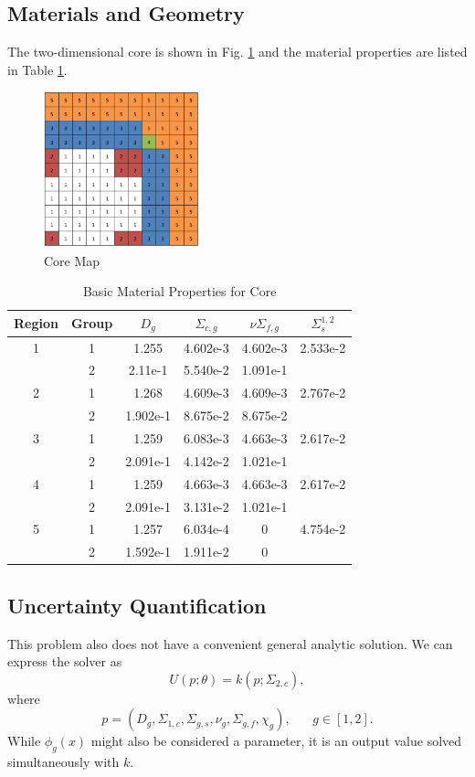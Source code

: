 \subsection{Materials and Geometry}
The two-dimensional core is shown in Fig. \ref{coremap} and the material properties are listed in Table \ref{tab:coremats}.
\begin{figure}[h]
\centering
   \includegraphics[width=0.4\textwidth]{../graphics/core}
   \caption{Core Map}
   \label{coremap}
\end{figure}
\begin{table}[h]
\centering
\begin{tabular}{c c | c c c c}
Region & Group & $D_g$ & $\Sigma_{c,g}$ & $\nu\Sigma_{f,g}$ & $\Sigma_s^{1,2}$ \\ \hline
1 & 1 & 1.255    & 4.602e-3 & 4.602e-3 & 2.533e-2 \\
  & 2 & 2.11e-1  & 5.540e-2 & 1.091e-1 & \\ \hline
2 & 1 & 1.268    & 4.609e-3 & 4.609e-3 & 2.767e-2 \\
  & 2 & 1.902e-1 & 8.675e-2 & 8.675e-2 & \\ \hline
3 & 1 & 1.259    & 6.083e-3 & 4.663e-3 & 2.617e-2 \\
  & 2 & 2.091e-1 & 4.142e-2 & 1.021e-1 & \\ \hline
4 & 1 & 1.259    & 4.663e-3 & 4.663e-3 & 2.617e-2 \\
  & 2 & 2.091e-1 & 3.131e-2 & 1.021e-1 & \\ \hline
5 & 1 & 1.257    & 6.034e-4  & 0 & 4.754e-2 \\
  & 2 & 1.592e-1 & 1.911e-2  & 0 & 
\end{tabular}
\caption{Basic Material Properties for Core}
\label{tab:coremats}
\end{table}

\subsection{Uncertainty Quantification}
This problem also does not have a convenient general analytic solution.  We can express the solver as
\begin{equation}
U(p;\theta) = k(p;\Sigma_{2,c}),
\end{equation}
where
\begin{equation}
p=(D_g,\Sigma_{1,c},\Sigma_{g,s},\nu_g,\Sigma_{g,f},\chi_g),\hspace{20pt}g\in[1,2].
\end{equation}
While $\phi_g(x)$ might also be considered a parameter, it is an output value solved simultaneously with $k$.

